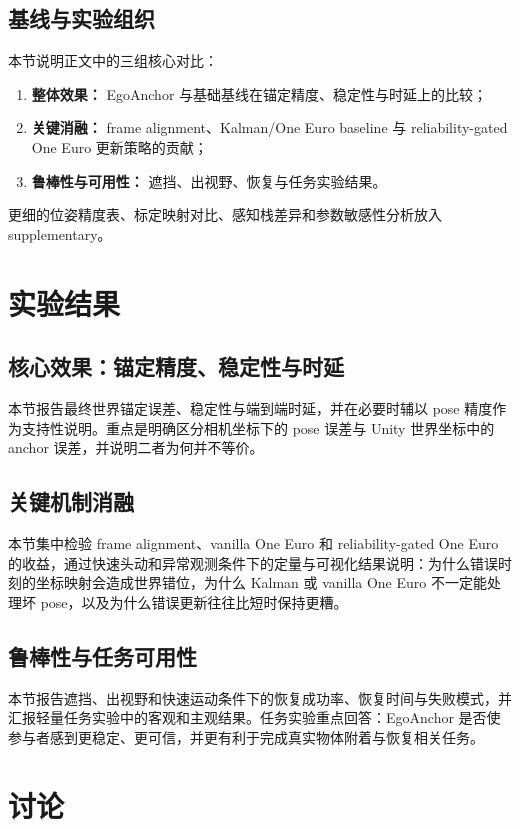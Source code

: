 \documentclass[review]{vgtc}
\begin{document}
\subsection{基线与实验组织}
本节说明正文中的三组核心对比：
\begin{enumerate}
  \item \textbf{整体效果：} EgoAnchor 与基础基线在锚定精度、稳定性与时延上的比较；
  \item \textbf{关键消融：} frame alignment、Kalman/One Euro baseline 与 reliability-gated One Euro 更新策略的贡献；
  \item \textbf{鲁棒性与可用性：} 遮挡、出视野、恢复与任务实验结果。
\end{enumerate}
更细的位姿精度表、标定映射对比、感知栈差异和参数敏感性分析放入 supplementary。

\section{实验结果}

\subsection{核心效果：锚定精度、稳定性与时延}
本节报告最终世界锚定误差、稳定性与端到端时延，并在必要时辅以 pose 精度作为支持性说明。重点是明确区分相机坐标下的 pose 误差与 Unity 世界坐标中的 anchor 误差，并说明二者为何并不等价。

\subsection{关键机制消融}
本节集中检验 frame alignment、vanilla One Euro 和 reliability-gated One Euro 的收益，通过快速头动和异常观测条件下的定量与可视化结果说明：为什么错误时刻的坐标映射会造成世界错位，为什么 Kalman 或 vanilla One Euro 不一定能处理坏 pose，以及为什么错误更新往往比短时保持更糟。

\subsection{鲁棒性与任务可用性}
本节报告遮挡、出视野和快速运动条件下的恢复成功率、恢复时间与失败模式，并汇报轻量任务实验中的客观和主观结果。任务实验重点回答：EgoAnchor 是否使参与者感到更稳定、更可信，并更有利于完成真实物体附着与恢复相关任务。

\section{讨论}
\end{document}
